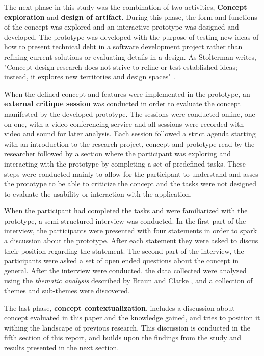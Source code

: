 The next phase in this study was the combination of two activities, \textbf{Concept exploration}  and \textbf{design of artifact}.
During this phase, the form and functions of the concept was explored and an interactive prototype was designed and developed.
The prototype was developed with the purpose of testing new ideas of how to present technical debt in a software development project rather than refining current solutions or evaluating details in a design.
As Stolterman writes, "Concept design research does not strive to refine or test established ideas; instead, it explores new territories and design spaces" \cite{stolterman_concept-driven_2010}.

When the defined concept and features were implemented in the prototype, an \textbf{external critique session} was conducted in order to evaluate the concept manifested by the developed prototype.
The sessions were conducted online, one-on-one, with a video conferencing service and all sessions were recorded with video and sound for later analysis.
Each session followed a strict agenda starting with an introduction to the research project, concept and prototype read by the researcher followed by a section where the participant was exploring and interacting with the prototype by completing a set of predefined tasks.
These steps were conducted mainly to allow for the participant to understand and asses the prototype to be able to criticize the concept and the tasks were not designed to evaluate the usability or interaction with the application.

When the participant had completed the tasks and were familiarized with the prototype, a semi-structured interview was conducted.
In the first part of the interview, the participants were presented with four statements in order to spark a discussion about the prototype.
After each statement they were asked to discus their position regarding the statement.
The second part of the interview, the participants were asked a set of open ended questions about the concept in general.
After the interview were conducted, the data collected were analyzed using the \textit{thematic analysis} described by Braun and Clarke \cite{braun_using_2006}, and a collection of themes and sub-themes were discovered.

The last phase, \textbf{concept contextualization}, includes a discussion about concept evaluated in this paper and the knowledge gained, and tries to position it withing the landscape of previous research. This discussion is conducted in the fifth section of this report, and builds upon the findings from the study and results presented in the next section.